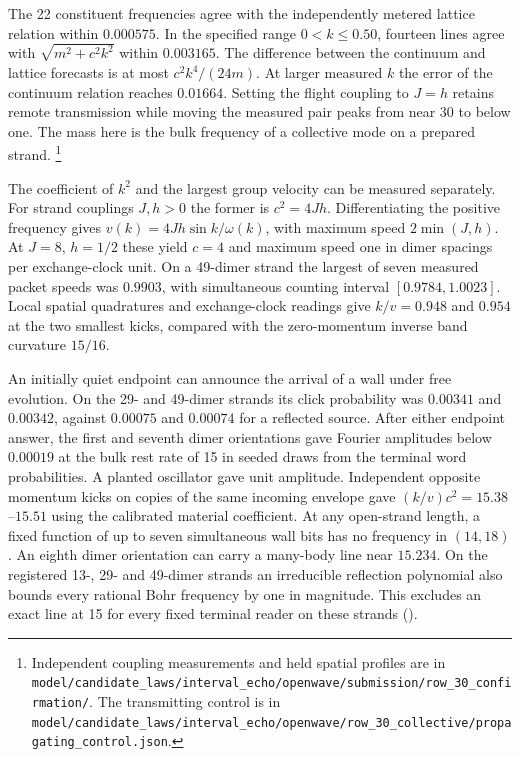 \documentclass[11pt]{article}
\theoremstyle{definition}
\theoremstyle{remark}
\theoremstyle{plain}
\begin{document}
The 22 constituent frequencies agree with the independently metered
lattice relation within \(0.000575\). In the specified range
\(0<k\leq0.50\), fourteen lines agree with
\(\sqrt{m^2+c^2k^2}\) within \(0.003165\). The difference between the
continuum and lattice forecasts is at most \(c^2 k^4/(24m)\). At
larger measured \(k\) the error of the continuum relation reaches
\(0.01664\). Setting the flight coupling to \(J=h\) retains remote
transmission while moving the measured pair peaks from near 30 to
below one. The mass here is the bulk frequency of a collective mode
on a prepared strand.%
\footnote{Independent coupling measurements and held spatial profiles are in
\nolinkurl{model/candidate_laws/interval_echo/openwave/submission/row_30_confirmation/}.
The transmitting control is in
\nolinkurl{model/candidate_laws/interval_echo/openwave/row_30_collective/propagating_control.json}.}

The coefficient of \(k^2\) and the largest group velocity can be measured
separately. For strand couplings \(J,h>0\) the former is \(c^2=4Jh\).
Differentiating the positive frequency gives
\(v(k)=4Jh\sin k/\omega(k)\), with maximum speed \(2\min(J,h)\).
At \(J=8\), \(h=1/2\) these yield \(c=4\) and maximum speed one in
dimer spacings per exchange-clock unit. On a 49-dimer strand the largest
of seven measured packet speeds was \(0.9903\), with simultaneous
counting interval \([0.9784,1.0023]\). Local spatial quadratures and
exchange-clock readings give \(k/v=0.948\) and \(0.954\) at the two
smallest kicks, compared with the zero-momentum inverse band curvature
\(15/16\).

An initially quiet endpoint can announce the arrival of a wall under
free evolution. On the 29- and 49-dimer strands its click probability
was \(0.00341\) and \(0.00342\), against \(0.00075\) and \(0.00074\)
for a reflected source. After either endpoint answer, the first and
seventh dimer orientations gave Fourier amplitudes below \(0.00019\)
at the bulk rest rate of 15 in seeded draws from the terminal word
probabilities. A planted oscillator gave unit amplitude. Independent
opposite momentum kicks on copies of the same incoming envelope
gave \((k/v)c^2=15.38\)--\(15.51\) using the calibrated material
coefficient. At any open-strand length, a fixed function of up to
seven simultaneous wall bits has no frequency in \((14,18)\).
An eighth dimer orientation can carry a many-body line near
\(15.234\). On the registered 13-, 29- and 49-dimer strands an
irreducible reflection polynomial also bounds every rational Bohr
frequency by one in magnitude. This excludes an exact line at 15
for every fixed terminal reader on these strands
().
\end{document}
